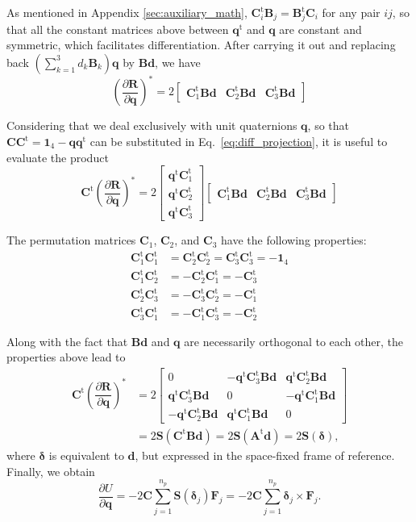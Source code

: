 \documentclass[aip,jcp,reprint,amsmath,amssymb]{revtex4-1}
\newcommand{\mt}[1]{\boldsymbol{\mathbf{#1}}}           %
\newcommand{\vt}[1]{\boldsymbol{\mathbf{#1}}}           %
\newcommand{\tr}[1]{#1^\text{t}}                               %
\newcommand{\diff}[2]{\dfrac{\partial #1}{\partial #2}} %
\begin{document}
As mentioned in Appendix \ref{sec:auxiliary_math}, $\tr{\mt C}_i \mt B_j = \tr{\mt B}_j \mt C_i$ for any pair $ij$, so that all the constant matrices above between $\tr{\vt q}$ and $\vt q$ are constant and symmetric, which facilitates differentiation. After carrying it out and replacing back $(\sum_{k=1}^3 d_k \mt B_k) \vt q$ by $\mt B \vt d$, we have
\[
\left( \diff{\vt R}{\vt q} \right)^\ast = 2 \left[\begin{array}{ccc}
\tr{\mt C}_1 \mt B \vt d & \tr{\mt C}_2 \mt B \vt d & \tr{\mt C}_3 \mt B \vt d
\end{array}\right]
\]

Considering that we deal exclusively with unit quaternions $\vt q$, so that $\mt C \tr{\mt C} = \mt 1_4 - \vt q \tr{\vt q}$ can be substituted in Eq.~\ref{eq:diff_projection}, it is useful to evaluate the product
\[
\tr{\mt C} \left( \diff{\vt R}{\vt q} \right)^\ast = 2 \left[\begin{array}{c}
\tr{\vt q}\tr{\mt C_1} \\
\tr{\vt q}\tr{\mt C_2} \\
\tr{\vt q}\tr{\mt C_3}
\end{array}\right] \left[\begin{array}{ccc}
\tr{\mt C}_1 \mt B \vt d & \tr{\mt C}_2 \mt B \vt d & \tr{\mt C}_3 \mt B \vt d
\end{array}\right]
\]

The permutation matrices $\mt C_1$, $\mt C_2$, and $\mt C_3$ have the following properties:
\begin{equation}
\begin{aligned}
\tr{\mt C_1}\tr{\mt C_1} &= \tr{\mt C_2}\tr{\mt C_2} = \tr{\mt C_3}\tr{\mt C_3} = -\mt 1_4 \\
\tr{\mt C_1}\tr{\mt C_2} &= -\tr{\mt C_2}\tr{\mt C_1} = -\tr{\mt C_3} \\
\tr{\mt C_2}\tr{\mt C_3} &= -\tr{\mt C_3}\tr{\mt C_2} = -\tr{\mt C_1} \\
\tr{\mt C_3}\tr{\mt C_1} &= -\tr{\mt C_1}\tr{\mt C_3} = -\tr{\mt C_2}
\end{aligned}
\end{equation}

Along with the fact that $\mt B\vt d$ and $\vt q$ are necessarily orthogonal to each other, the properties above lead to
\begin{align*}
\tr{\mt C} \left( \diff{\vt R}{\vt q} \right)^\ast &= 2 \left[\begin{array}{ccc}
0 & -\tr{\vt q}\tr{\mt C}_3 \mt B \vt d & \tr{\vt q}\tr{\mt C}_2 \mt B \vt d \\
\tr{\vt q}\tr{\mt C}_3 \mt B \vt d & 0 & -\tr{\vt q}\tr{\mt C}_1 \mt B \vt d \\
-\tr{\vt q}\tr{\mt C}_2 \mt B \vt d & \tr{\vt q}\tr{\mt C}_1 \mt B \vt d & 0
\end{array}\right] \\
&= 2 \mt S(\tr{\mt C} \mt B \vt d) = 2 \mt S(\tr{\mt A}\vt d) = 2 \mt S(\vt \delta),
\end{align*}
where $\vt \delta$ is equivalent to $\vt d$, but expressed in the space-fixed frame of reference. Finally, we obtain
\[
\diff{U}{\vt q} = - 2 \mt C \sum_{j=1}^{n_p} \mt S(\vt \delta_j) {\vt F_j}  = - 2 \mt C \sum_{j=1}^{n_p} \vt \delta_j \times {\vt F_j}.
\]
\end{document}
